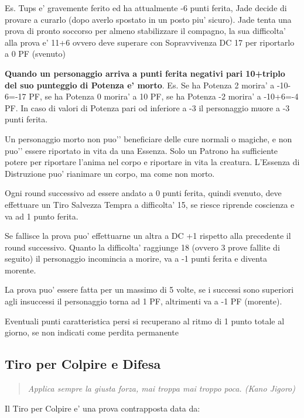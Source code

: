 \documentclass[a4paper,11pt,twoside,openany]{book}
\begin{document}
Es. Tups e’ gravemente ferito ed ha attualmente -6 punti ferita, Jade decide di provare a curarlo (dopo averlo spostato in un posto piu’ sicuro). Jade tenta una prova di pronto soccorso per almeno stabilizzare il compagno, la sua difficolta’ alla prova e’ 11+6 ovvero deve superare con Sopravvivenza DC 17 per riportarlo a 0 PF (svenuto)

\textbf{Quando un personaggio arriva a punti ferita negativi pari 10+triplo del suo punteggio di Potenza e’ morto}. Es. Se ha Potenza 2 morira’ a -10-6=-17 PF, se ha Potenza 0 morira’ a 10 PF, se ha Potenza -2 morira’ a -10+6=-4 PF. In caso di valori di Potenza pari od inferiore a -3 il personaggio muore a -3 punti ferita.

\bigskip

Un personaggio morto non puo'’ beneficiare delle cure normali o magiche, e non puo'’ essere riportato in vita da una Essenza. Solo un Patrono ha sufficiente potere per riportare l’anima nel corpo e riportare in vita la creatura. L’Essenza di Distruzione puo' rianimare un corpo, ma come non morto.

Ogni round successivo ad essere andato a 0 punti ferita, quindi svenuto, deve effettuare un Tiro Salvezza Tempra a difficolta’ 15, se riesce riprende coscienza e va ad 1 punto ferita.

Se fallisce la prova puo’ effettuarne un altra a DC +1 rispetto alla precedente il round successivo. Quanto la difficolta’ raggiunge 18 (ovvero 3 prove fallite di seguito) il personaggio incomincia a morire, va a -1 punti ferita e diventa morente.

La prova puo’ essere fatta per un massimo di 5 volte, se i successi sono superiori agli insuccessi il personaggio torna ad 1 PF, altrimenti va a -1 PF (morente).

Eventuali punti caratteristica persi si recuperano al ritmo di 1 punto totale al giorno, se non indicati come perdita permanente
\pagebreak

\subsection{Tiro per Colpire e Difesa}

\label{tiro-per-colpire}
\begin{quote}\textit{Applica sempre la giusta forza, mai troppa mai troppo poca. (Kano Jigoro)
}\end{quote}

Il Tiro per Colpire e' una prova contrapposta data da:
\end{document}
